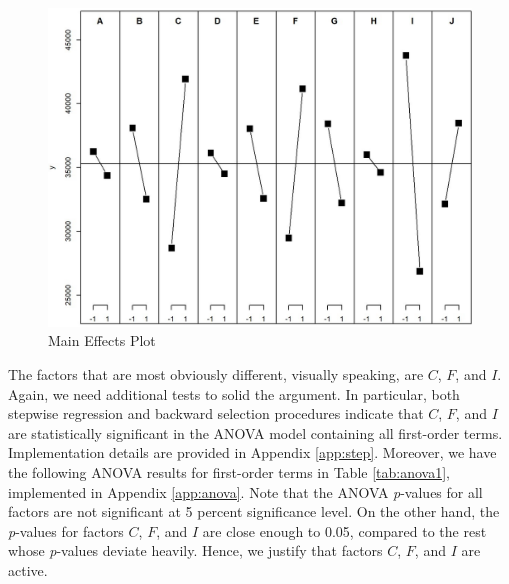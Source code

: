 \documentclass[11pt]{article}
\begin{document}
\begin{figure}[h!]
\centering
\includegraphics[scale = 0.6]{main}
\caption{Main Effects Plot}\label{fig:main}
\end{figure}

The factors that are most obviously different, visually speaking, are $C$, $F$, and $I$. Again, we need additional tests to solid the argument. In particular, both stepwise regression and backward selection procedures indicate that $C$, $F$, and $I$ are statistically significant in the ANOVA model containing all first-order terms. Implementation details are provided in Appendix \ref{app:step}. Moreover, we have the following ANOVA results for first-order terms in Table \ref{tab:anova1}, implemented in Appendix \ref{app:anova}. Note that the ANOVA \textit{p}-values for all factors are not significant at 5 percent significance level. On the other hand, the \textit{p}-values for factors $C$, $F$, and $I$ are close enough to 0.05, compared to the rest whose \textit{p}-values deviate heavily. Hence, we justify that factors $C$, $F$, and $I$ are active.
\end{document}
